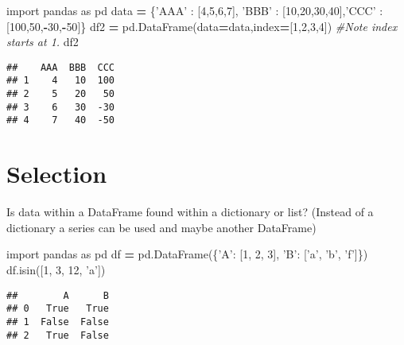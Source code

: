 \documentclass[]{book}
\newenvironment{Shaded}{\begin{snugshade}}{\end{snugshade}}
\newcommand{\DecValTok}[1]{\textcolor[rgb]{0.00,0.00,0.81}{#1}}
\newcommand{\StringTok}[1]{\textcolor[rgb]{0.31,0.60,0.02}{#1}}
\newcommand{\ImportTok}[1]{#1}
\newcommand{\CommentTok}[1]{\textcolor[rgb]{0.56,0.35,0.01}{\textit{#1}}}
\newcommand{\OperatorTok}[1]{\textcolor[rgb]{0.81,0.36,0.00}{\textbf{#1}}}
\newcommand{\NormalTok}[1]{#1}
\begin{document}
\begin{Shaded}
\begin{Highlighting}[]
\ImportTok{import}\NormalTok{ pandas }\ImportTok{as}\NormalTok{ pd}
\NormalTok{data }\OperatorTok{=}\NormalTok{ \{}\StringTok{'AAA'}\NormalTok{ : [}\DecValTok{4}\NormalTok{,}\DecValTok{5}\NormalTok{,}\DecValTok{6}\NormalTok{,}\DecValTok{7}\NormalTok{], }\StringTok{'BBB'}\NormalTok{ : [}\DecValTok{10}\NormalTok{,}\DecValTok{20}\NormalTok{,}\DecValTok{30}\NormalTok{,}\DecValTok{40}\NormalTok{],}\StringTok{'CCC'}\NormalTok{ : [}\DecValTok{100}\NormalTok{,}\DecValTok{50}\NormalTok{,}\OperatorTok{-}\DecValTok{30}\NormalTok{,}\OperatorTok{-}\DecValTok{50}\NormalTok{]\}}
\NormalTok{df2 }\OperatorTok{=}\NormalTok{ pd.DataFrame(data}\OperatorTok{=}\NormalTok{data,index}\OperatorTok{=}\NormalTok{[}\DecValTok{1}\NormalTok{,}\DecValTok{2}\NormalTok{,}\DecValTok{3}\NormalTok{,}\DecValTok{4}\NormalTok{]) }\CommentTok{#Note index starts at 1.}
\NormalTok{df2}
\end{Highlighting}
\end{Shaded}

\begin{verbatim}
##    AAA  BBB  CCC
## 1    4   10  100
## 2    5   20   50
## 3    6   30  -30
## 4    7   40  -50
\end{verbatim}

\section{Selection}\label{selection}

Is data within a DataFrame found within a dictionary or list? (Instead
of a dictionary a series can be used and maybe another DataFrame)

\begin{Shaded}
\begin{Highlighting}[]
\ImportTok{import}\NormalTok{ pandas }\ImportTok{as}\NormalTok{ pd}
\NormalTok{df }\OperatorTok{=}\NormalTok{ pd.DataFrame(\{}\StringTok{'A'}\NormalTok{: [}\DecValTok{1}\NormalTok{, }\DecValTok{2}\NormalTok{, }\DecValTok{3}\NormalTok{], }\StringTok{'B'}\NormalTok{: [}\StringTok{'a'}\NormalTok{, }\StringTok{'b'}\NormalTok{, }\StringTok{'f'}\NormalTok{]\})}
\NormalTok{df.isin([}\DecValTok{1}\NormalTok{, }\DecValTok{3}\NormalTok{, }\DecValTok{12}\NormalTok{, }\StringTok{'a'}\NormalTok{])}
\end{Highlighting}
\end{Shaded}

\begin{verbatim}
##        A      B
## 0   True   True
## 1  False  False
## 2   True  False
\end{verbatim}
\end{document}
